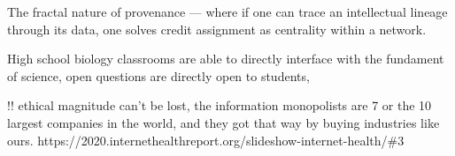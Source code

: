 \documentclass[11pt]{article}
\begin{document}
\begin{multicols}{2}
The fractal nature of provenance --- where if one can trace an
intellectual lineage through its data, one solves credit assignment as
centrality within a network.

High school biology classrooms are able to directly interface with the
fundament of science, open questions are directly open to students,

!! ethical magnitude can't be lost, the information monopolists are 7 or
the 10 largest companies in the world, and they got that way by buying
industries like ours.
https://2020.internethealthreport.org/slideshow-internet-health/\#3

\end{multicols}


 
\end{document}
